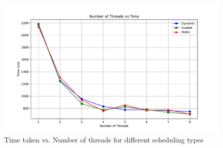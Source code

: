 \documentclass[12pt]{article}
\begin{document}
\subsection{}
\begin{figure}[ht]
    \centering
    \includegraphics[width=\textwidth]{task4.pdf}
    \caption{Time taken vs. Number of threads for different scheduling types}
\end{figure}
\end{document}
